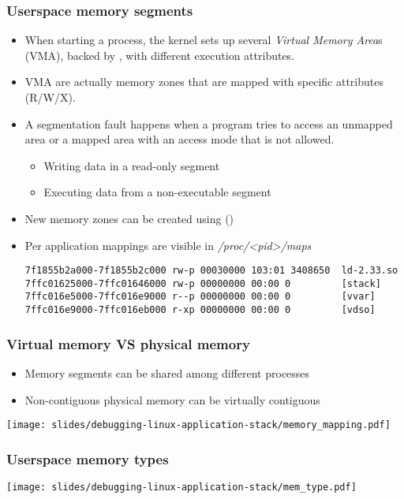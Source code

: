 \begin{frame}[fragile]
  \frametitle{Userspace memory segments}
  \begin{itemize}
    \item When starting a process, the kernel sets up several {\em Virtual
          Memory Area}s (VMA), backed by , with
          different execution attributes.
    \item VMA are actually memory zones that are mapped with specific
          attributes (R/W/X).
    \item A segmentation fault happens when a program tries to access an
      unmapped area or a mapped area with an access mode that is not
      allowed.
    \begin{itemize}
      \item Writing data in a read-only segment
      \item Executing data from a non-executable segment
    \end{itemize}
    \item New memory zones can be created using 
          ()
    \item Per application mappings are visible in {\em /proc/<pid>/maps}\\
    \begin{verbatim}
7f1855b2a000-7f1855b2c000 rw-p 00030000 103:01 3408650  ld-2.33.so
7ffc01625000-7ffc01646000 rw-p 00000000 00:00 0         [stack]
7ffc016e5000-7ffc016e9000 r--p 00000000 00:00 0         [vvar]
7ffc016e9000-7ffc016eb000 r-xp 00000000 00:00 0         [vdso]
    \end{verbatim}
  \end{itemize}
\end{frame}

\begin{frame}
  \frametitle{Virtual memory VS physical memory}
  \begin{itemize}
    \item Memory segments can be shared among different processes
    \item Non-contiguous physical memory can be virtually contiguous
  \end{itemize}
  \center\texttt{[image: slides/debugging-linux-application-stack/memory\_mapping.pdf]}
\end{frame}

\begin{frame}[fragile]
  \frametitle{Userspace memory types}
  \center \texttt{[image: slides/debugging-linux-application-stack/mem\_type.pdf]}
\end{frame}

